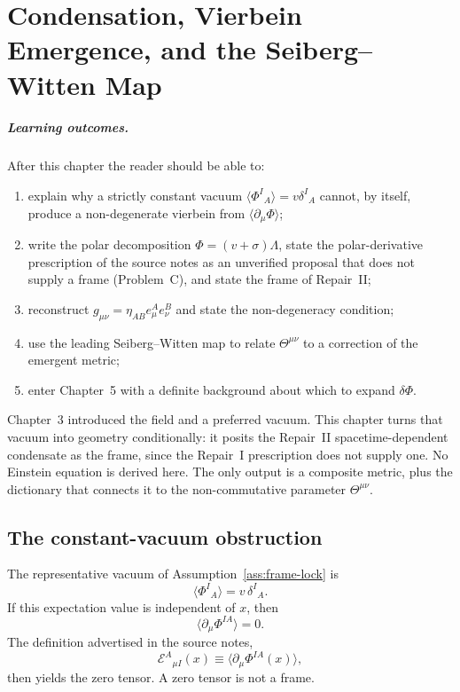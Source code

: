 \chapter[Vierbein emergence]{Condensation, Vierbein Emergence, and the Seiberg--Witten Map}
\label{ch:vierbein-emergence}

\paragraph{Learning outcomes.}
After this chapter the reader should be able to:
\begin{enumerate}
  \item explain why a strictly constant vacuum
        \(\langle\Phi^I{}_A\rangle=v\delta^I{}_A\) cannot, by itself,
        produce a non-degenerate vierbein from
        \(\langle\partial_\mu\Phi\rangle\);
  \item write the polar decomposition
        \(\Phi=(v+\sigma)\Lambda\), state the polar-derivative
        prescription of the source notes as an unverified
        proposal that does not supply a frame (Problem~C), and
        state the frame of Repair~II;
  \item reconstruct \(g_{\mu\nu}=\eta_{AB}e^A_\mu e^B_\nu\) and state
        the non-degeneracy condition;
  \item use the leading Seiberg--Witten map to relate
        \(\Theta^{\mu\nu}\) to a correction of the emergent metric;
  \item enter Chapter~5 with a definite background about which to
        expand \(\delta\Phi\).
\end{enumerate}

Chapter~3 introduced the field and a preferred vacuum. This chapter
turns that vacuum into geometry conditionally: it posits the Repair~II
spacetime-dependent condensate as the frame, since the Repair~I
prescription does not supply one. No Einstein equation is derived
here. The only output is a composite metric, plus the dictionary that
connects it to the non-commutative parameter \(\Theta^{\mu\nu}\).

\section{The constant-vacuum obstruction}
\label{sec:ch4-obstruction}

The representative vacuum of Assumption~\ref{ass:frame-lock} is
\begin{equation}
  \label{eq:const-vev}
  \langle\Phi^I{}_A\rangle=v\,\delta^I{}_A.
\end{equation}
If this expectation value is independent of \(x\), then
\begin{equation}
  \label{eq:vanishing-frame}
  \langle\partial_\mu\Phi^{IA}\rangle=0.
\end{equation}
The definition advertised in the source notes,
\begin{equation}
  \label{eq:naive-vierbein}
  \mathcal{E}^A{}_{\mu I}(x)
  \equiv
  \langle\partial_\mu\Phi^{IA}(x)\rangle,
\end{equation}
then yields the zero tensor. A zero tensor is not a frame.

